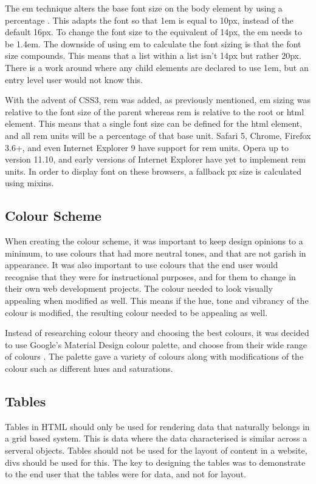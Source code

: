 The \gls{em} technique alters the base font size on the body element by using a percentage \citep{GUN16}. This adapts the font so that 1em is equal to 10px, instead of the default 16px. To change the font size to the equivalent of 14px, the \gls{em} needs to be 1.4em. The downside of using \gls{em} to calculate the font sizing is that the font size compounds. This means that a list within a list isn't 14px but rather 20px. There is a work around where any child elements are declared to use 1em, but an entry level user would not know this. 

With the advent of \gls{CSS}3, \gls{rem} was added, as previously mentioned, \gls{em} sizing was relative to the font size of the parent whereas \gls{rem} is relative to the root or html element. This means that a single font size can be defined for the html element, and all \gls{rem} units will be a percentage of that base unit. Safari 5, Chrome, Firefox 3.6+, and even Internet Explorer 9 have support for \gls{rem} units. Opera up to version 11.10, and early versions of Internet Explorer have yet to implement \gls{rem} units. In order to display font on these browsers, a fallback \gls{px} size is calculated using \gls{mixins}. 

\subsection*{Colour Scheme}
When creating the colour scheme, it was important to keep design opinions to a minimum, to use colours that had more neutral tones, and that are not garish in appearance. It was also important to use colours that the end user would recognise that they were for instructional purposes, and for them to change in their own web development projects. The colour needed to look visually appealing when modified as well. This means if the hue, tone and vibrancy of the colour is modified, the resulting colour needed to be appealing as well. 

Instead of researching colour theory and choosing the best colours, it was decided to use Google's Material Design colour palette, and choose from their wide range of colours \citep{Google17}. The palette  gave a variety of colours along with modifications of the colour such as different hues and saturations.

\newpage
\subsection*{Tables}
Tables in HTML should only be used for rendering data that naturally belongs in a grid based system. This is data where the data characterised is similar across a serveral objects. Tables should not be used for the layout of content in a website, divs should be used for this. The key to designing the tables was to demonstrate to the end user that the tables were for data, and not for layout.


